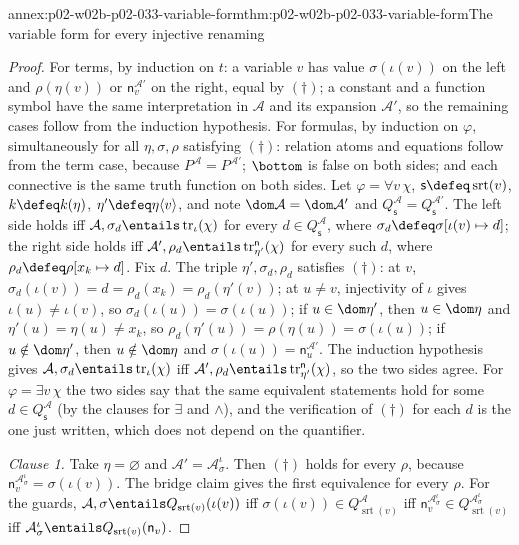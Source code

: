\begin{annexitem}{annex:p02-w02b-p02-033-variable-form}{thm:p02-w02b-p02-033-variable-form}{The variable form for every injective renaming}
\begin{proof}
For terms, by induction on \(t\): a variable \(v\) has value
\(\sigma(\iota(v))\) on the left and \(\rho(\eta(v))\) or
\(\mathsf n_v^{\mathcal A'}\) on the right, equal by \((\dagger)\); a
constant and a function symbol have the same interpretation in
\(\mathcal A\) and its expansion \(\mathcal A'\), so the remaining cases
follow from the induction hypothesis.  For formulas, by induction on
\(\varphi\), simultaneously for all \(\eta,\sigma,\rho\) satisfying
\((\dagger)\): relation atoms and equations follow from the term case,
because \(P^{\mathcal A}=P^{\mathcal A'}\); \(\bottom\) is false on both
sides; and each connective is the same truth function on both sides.  Let
\(\varphi=\forall v\,\chi\), \(\mathsf s\defeq\operatorname{srt}(v)\),
\(k\defeq k(\eta)\), \(\eta'\defeq\eta\langle v\rangle\), and note
\(\dom\mathcal A=\dom\mathcal A'\) and
\(Q_{\mathsf s}^{\mathcal A}=Q_{\mathsf s}^{\mathcal A'}\).  The left side
holds iff \(\mathcal A,\sigma_d\entails\operatorname{tr}_{\iota}(\chi)\) for
every \(d\in Q_{\mathsf s}^{\mathcal A}\), where
\(\sigma_d\defeq\sigma[\iota(v)\mapsto d]\); the right side holds iff
\(\mathcal A',\rho_d\entails\operatorname{tr}^{\mathsf n}_{\eta'}(\chi)\) for
every such \(d\), where \(\rho_d\defeq\rho[x_k\mapsto d]\).  Fix \(d\).  The
triple \(\eta',\sigma_d,\rho_d\) satisfies \((\dagger)\): at \(v\),
\(\sigma_d(\iota(v))=d=\rho_d(x_k)=\rho_d(\eta'(v))\); at \(u\ne v\),
injectivity of \(\iota\) gives \(\iota(u)\ne\iota(v)\), so
\(\sigma_d(\iota(u))=\sigma(\iota(u))\); if \(u\in\dom\eta'\), then
\(u\in\dom\eta\) and \(\eta'(u)=\eta(u)\ne x_k\), so
\(\rho_d(\eta'(u))=\rho(\eta(u))=\sigma(\iota(u))\); if
\(u\notin\dom\eta'\), then \(u\notin\dom\eta\) and
\(\sigma(\iota(u))=\mathsf n_u^{\mathcal A'}\).  The induction hypothesis
gives \(\mathcal A,\sigma_d\entails\operatorname{tr}_{\iota}(\chi)\) iff
\(\mathcal A',\rho_d\entails\operatorname{tr}^{\mathsf n}_{\eta'}(\chi)\), so
the two sides agree.  For \(\varphi=\exists v\,\chi\) the two sides say that
the same equivalent statements hold for some \(d\in Q_{\mathsf s}^{\mathcal A}\)
(by the clauses for \(\exists\) and \(\land\)), and the verification of
\((\dagger)\) for each \(d\) is the one just written, which does not depend on
the quantifier.

\emph{Clause 1.}  Take \(\eta=\varnothing\) and
\(\mathcal A'=\mathcal A_{\sigma}^{\iota}\).  Then \((\dagger)\) holds for
every \(\rho\), because \(\mathsf n_v^{\mathcal A_{\sigma}^{\iota}}=
\sigma(\iota(v))\).  The bridge claim gives the first equivalence for every
\(\rho\).  For the guards, \(\mathcal A,\sigma\entails
Q_{\operatorname{srt}(v)}(\iota(v))\) iff \(\sigma(\iota(v))\in
Q_{\operatorname{srt}(v)}^{\mathcal A}\) iff \(\mathsf n_v^{\mathcal A_{\sigma}^{\iota}}
\in Q_{\operatorname{srt}(v)}^{\mathcal A_{\sigma}^{\iota}}\) iff
\(\mathcal A_{\sigma}^{\iota}\entails Q_{\operatorname{srt}(v)}(\mathsf n_v)\).


\end{proof}
\end{annexitem}
